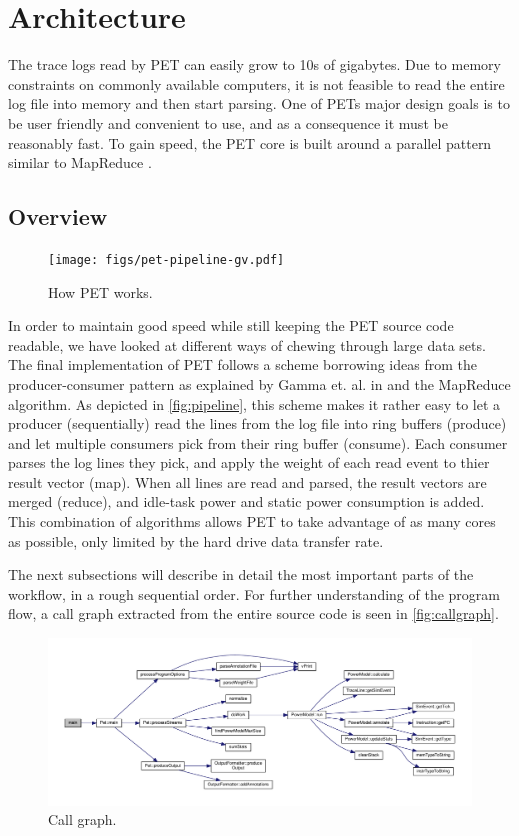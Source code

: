 \section{Architecture}

The trace logs read by PET can easily grow to 10s of gigabytes. Due to memory
constraints on commonly available computers, it is not feasible to read the
entire log file into memory and then start parsing. One of PETs major design
goals is to be user friendly and convenient to use, and as a consequence it must
be reasonably fast. To gain speed, the PET core is built around a parallel
pattern similar to MapReduce \cite{dean2008mapreduce}.


\subsection{Overview}

\begin{figure}[ht]
    \texttt{[image: figs/pet-pipeline-gv.pdf]}
    \caption{How PET works.}
    \label{fig:pipeline}
\end{figure}

In order to maintain good speed while still keeping the PET source code
readable, we have looked at different ways of chewing through large data sets.
The final implementation of PET follows a scheme borrowing ideas from the
producer-consumer pattern as explained by Gamma et. al. in \cite{designpatterns}
and the MapReduce algorithm. As depicted in \autoref{fig:pipeline}, this scheme
makes it rather easy to let a producer (sequentially) read the lines from the
log file into ring buffers (produce) and let multiple consumers pick from their
ring buffer (consume). Each consumer parses the log lines they pick, and apply
the weight of each read event to thier result vector (map). When all lines are
read and parsed, the result vectors are merged (reduce), and idle-task power and
static power consumption is added. This combination of algorithms allows PET to
take advantage of as many cores as possible, only limited by the hard drive data
transfer rate.

The next subsections will describe in detail the most important parts of the
workflow, in a rough sequential order. For further understanding of the program
flow, a call graph extracted from the entire source code is seen in
\autoref{fig:callgraph}.

\begin{figure}
    \includegraphics[width=\textwidth]{figs/maincallgraph.pdf}
    \caption{Call graph.}
    \label{fig:callgraph}
\end{figure}


